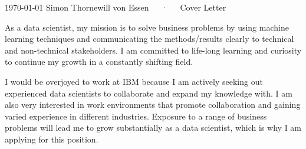 \documentclass[11pt, a4paper]{awesome-cv}
\begin{document}
\makecvheader[R]

\makecvfooter
  {\today}
  {Simon Thornewill von Essen~~~·~~~Cover Letter}
  {}

\makelettertitle

\begin{cvletter}

  As a data scientist, my mission is to solve business problems by using machine
  learning techniques and communicating the methods/results clearly to technical
  and non-technical stakeholders. I am committed to life-long learning and
  curiosity to continue my growth in a constantly shifting field.

  I would be overjoyed to work at IBM because I am actively seeking out
  experienced data scientists to collaborate and expand my knowledge with. I am
  also very interested in work environments that promote collaboration and
  gaining varied experience in different industries. Exposure to a range of
  business problems will lead me to grow substantially as a data scientist,
  which is why I am applying for this position.

  \begin{comment}
    During my nanodegree with Udacity, I worked with real-world datasets that
    often required data wrangling before performing further analysis in R and
    Python notebook environments. For example,  I performed \href{http://datasciencedemonstrated.com/2017/12/03/gapminder/}{exploratory data anlysis}
    on datasets from \href{https://www.gapminder.org/}{gapminder} and I had to
    decide what to do with missing values before performing my analysis. I did
    this by deciding the maximum amount of tolerable missing values that I was
    appropriate for imputation and removed each country for which there was not
    enough data. This created a bias within my investigation, so I made sure to be
    aware of this outcome. This project shows that I am able to approach
    incomplete datasets and make choices to make them for investigation.
  \end{comment}


\end{cvletter}
\end{document}
